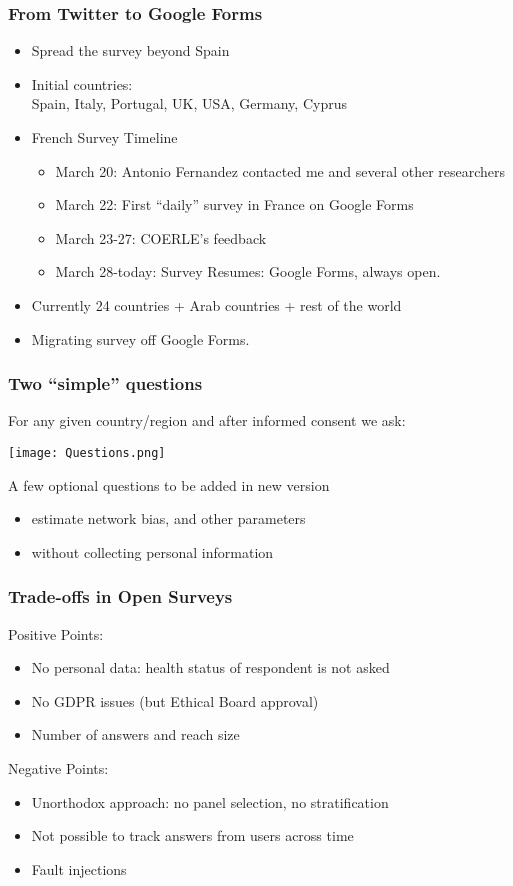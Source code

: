 \documentclass{beamer}
\begin{document}
\begin{frame}
\frametitle{From Twitter to Google Forms}
\begin{itemize}
\item Spread the survey beyond Spain 
\item Initial countries:\\
Spain, Italy, Portugal, UK, USA, Germany, Cyprus 
\item French Survey Timeline
\begin{itemize}
\item March 20: Antonio Fernandez contacted me and several other researchers
\item March 22: First ``daily'' survey in France on Google Forms
\item March 23-27: COERLE's  feedback
\item March 28-today: Survey Resumes: Google Forms, always open. 
\end{itemize}
\item Currently 24 countries + Arab countries + rest of the world
\item Migrating survey off Google Forms. 
\end{itemize}
\end{frame}

\begin{frame}
  \frametitle{Two ``simple'' questions}
  For any given country/region and after informed consent we ask:
  \begin{center}
  \texttt{[image: Questions.png]}
  \end{center}
  A few optional questions to be added in new version
  \begin{itemize}
  \item estimate network bias, and other parameters 
  \item without collecting personal information
  \end{itemize}

\end{frame}



\begin{frame}
  \frametitle{Trade-offs in Open Surveys}

 Positive Points:
  \begin{itemize}
    \item No personal data: health status of respondent is not asked
    \item No GDPR issues \hfill (but Ethical Board approval)
    \item Number of answers and reach size
  \end{itemize}
 Negative Points: 
  \begin{itemize}
    \item Unorthodox approach: no panel selection, no stratification
    \item Not possible to track answers from users across time
    \item Fault injections
  \end{itemize}
\end{frame}
\end{document}
